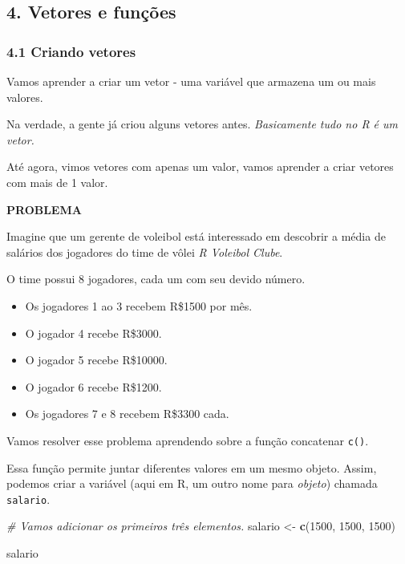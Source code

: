 \documentclass[
]{article}
\newenvironment{Shaded}{\begin{snugshade}}{\end{snugshade}}
\newcommand{\CommentTok}[1]{\textcolor[rgb]{0.56,0.35,0.01}{\textit{#1}}}
\newcommand{\DecValTok}[1]{\textcolor[rgb]{0.00,0.00,0.81}{#1}}
\newcommand{\KeywordTok}[1]{\textcolor[rgb]{0.13,0.29,0.53}{\textbf{#1}}}
\newcommand{\NormalTok}[1]{#1}
\newcommand{\StringTok}[1]{\textcolor[rgb]{0.31,0.60,0.02}{#1}}
\providecommand{\tightlist}{%
  \setlength{\itemsep}{0pt}\setlength{\parskip}{0pt}}
\begin{document}
\hypertarget{vetores-e-funuxe7uxf5es}{%
\subsection{4. Vetores e funções}\label{vetores-e-funuxe7uxf5es}}

\hypertarget{criando-vetores}{%
\subsubsection{4.1 Criando vetores}\label{criando-vetores}}

Vamos aprender a criar um vetor - uma variável que armazena um ou mais
valores.

Na verdade, a gente já criou alguns vetores antes. \emph{Basicamente
tudo no R é um vetor.}

Até agora, vimos vetores com apenas um valor, vamos aprender a criar
vetores com mais de 1 valor.

\textbf{PROBLEMA}

Imagine que um gerente de voleibol está interessado em descobrir a média
de salários dos jogadores do time de vôlei \emph{R Voleibol Clube}.

O time possui 8 jogadores, cada um com seu devido número.

\begin{itemize}
\tightlist
\item
  Os jogadores 1 ao 3 recebem R\$1500 por mês.
\item
  O jogador 4 recebe R\$3000.
\item
  O jogador 5 recebe R\$10000.
\item
  O jogador 6 recebe R\$1200.
\item
  Os jogadores 7 e 8 recebem R\$3300 cada.
\end{itemize}

Vamos resolver esse problema aprendendo sobre a função concatenar
\texttt{c()}.

Essa função permite juntar diferentes valores em um mesmo objeto. Assim,
podemos criar a variável (aqui em R, um outro nome para \emph{objeto})
chamada \texttt{salario}.

\begin{Shaded}
\begin{Highlighting}[]
\CommentTok{# Vamos adicionar os primeiros três elementos.}
\NormalTok{salario <-}\StringTok{ }\KeywordTok{c}\NormalTok{(}\DecValTok{1500}\NormalTok{, }\DecValTok{1500}\NormalTok{, }\DecValTok{1500}\NormalTok{)}

\NormalTok{salario}
\end{Highlighting}
\end{Shaded}
\end{document}
